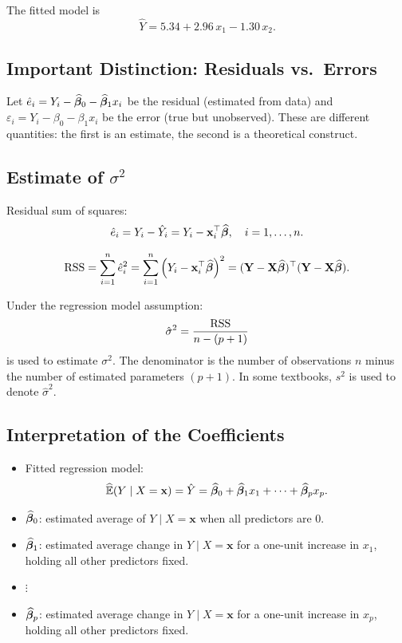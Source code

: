 The fitted model is
\[
\hat{Y} = 5.34 + 2.96\,x_1 - 1.30\,x_2.
\]

\subsection{Important Distinction: Residuals vs.\ Errors}

\begin{notebox}
Let $\hat{e}_i = Y_i - \widehat{\boldsymbol{\beta}}_0 - \widehat{\boldsymbol{\beta}}_1 x_i$ be the residual (estimated from data) and $\varepsilon_i = Y_i - \beta_0 - \beta_1 x_i$ be the error (true but unobserved). These are different quantities: the first is an estimate, the second is a theoretical construct.
\end{notebox}

\subsection{Estimate of $\sigma^2$}

Residual sum of squares:
\[
\hat{e}_i
= Y_i - \hat{Y}_i
= Y_i - \mathbf{x}_i^\top \widehat{\boldsymbol{\beta}},
\quad i = 1,\dots,n.
\]

\[
\mathrm{RSS}
= \sum_{i=1}^n \hat{e}_i^2
= \sum_{i=1}^n \left(Y_i - \mathbf{x}_i^\top \widehat{\boldsymbol{\beta}}\right)^2
= (\mathbf{Y} - \mathbf{X}\widehat{\boldsymbol{\beta}})^\top
   (\mathbf{Y} -\mathbf{X}\widehat{\boldsymbol{\beta}}).
\]

Under the regression model assumption:
\[
\hat{\sigma}^2
= \frac{\mathrm{RSS}}{n - (p+1)}
\]
is used to estimate $\sigma^2$. The denominator is the number of observations $n$ minus the number of estimated parameters $(p+1)$. In some textbooks, $s^2$ is used to denote $\hat{\sigma}^2$.

\subsection{Interpretation of the Coefficients}

\begin{itemize}
    \item Fitted regression model:
    \[
    \widehat{\mathbb{E}}(Y \mid X=\mathbf{x})
    = \hat{Y}
    = \widehat{\boldsymbol{\beta}}_0 + \widehat{\boldsymbol{\beta}}_1 x_1 + \cdots + \widehat{\boldsymbol{\beta}}_p x_p.
    \]

    \item $\widehat{\boldsymbol{\beta}}_0$: estimated average of $Y \mid X=\mathbf{x}$ when all predictors are $0$.

    \item $\widehat{\boldsymbol{\beta}}_1$: estimated average change in $Y \mid X=\mathbf{x}$ for a one-unit increase in $x_1$, holding all other predictors fixed.

    \item $\vdots$

    \item $\widehat{\boldsymbol{\beta}}_p$: estimated average change in $Y \mid X=\mathbf{x}$ for a one-unit increase in $x_p$, holding all other predictors fixed.
\end{itemize}

